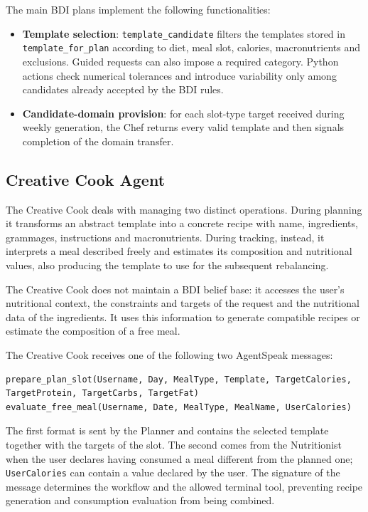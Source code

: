 \documentclass[12pt,a4paper]{article}
\begin{document}
The main BDI plans implement the following functionalities:
\begin{itemize}
    \item \textbf{Template selection}: \texttt{template\_candidate} filters the templates stored in \texttt{template\_for\_plan} according to diet, meal slot, calories, macronutrients and exclusions. Guided requests can also impose a required category. Python actions check numerical tolerances and introduce variability only among candidates already accepted by the BDI rules.
    \item \textbf{Candidate-domain provision}: for each slot-type target received during weekly generation, the Chef returns every valid template and then signals completion of the domain transfer.
\end{itemize}

\subsection{Creative Cook Agent}

The Creative Cook deals with managing two distinct operations. During
planning it transforms an abstract template into a concrete recipe with name, ingredients,
grammages, instructions and macronutrients. During tracking, instead, it interprets a meal described
freely and estimates its composition and nutritional values, also producing the template to use for
the subsequent rebalancing.

The Creative Cook does not maintain a BDI belief base: it accesses the user's nutritional context,
the constraints and targets of the request and the nutritional data of the ingredients. It uses this
information to generate compatible recipes or estimate the composition of a free meal.

The Creative Cook receives one of the following two AgentSpeak messages:

\begin{lstlisting}[caption={Input formats of the Creative Cook Agent}]
prepare_plan_slot(Username, Day, MealType, Template, TargetCalories, TargetProtein, TargetCarbs, TargetFat)
evaluate_free_meal(Username, Date, MealType, MealName, UserCalories)
\end{lstlisting}

The first format is sent by the Planner and contains the selected template together with the targets
of the slot. The second comes from the Nutritionist when the user declares having consumed a
meal different from the planned one; \texttt{UserCalories} can contain a value declared by the user.
The signature of the message determines the workflow and the allowed terminal tool, preventing
recipe generation and consumption evaluation from being combined.
\end{document}
